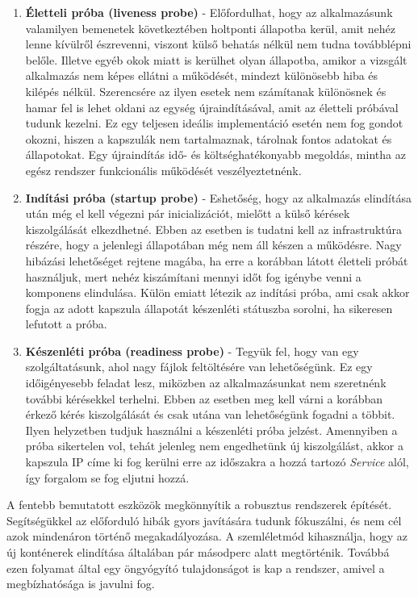 \begin{enumerate}
    \item \textbf{Életteli próba (liveness probe)} - Előfordulhat, hogy az alkalmazásunk valamilyen bemenetek következtében holtponti állapotba kerül, amit nehéz lenne kívülről észrevenni, viszont külső behatás nélkül nem tudna továbblépni belőle. 
    Illetve egyéb okok miatt is kerülhet olyan állapotba, amikor a vizsgált alkalmazás nem képes ellátni a működését, mindezt különösebb hiba és kilépés nélkül.
    Szerencsére az ilyen esetek nem számítanak különösnek és hamar fel is lehet oldani az egység újraindításával, amit az életteli próbával tudunk kezelni.
    Ez egy teljesen ideális implementáció esetén nem fog gondot okozni, hiszen a kapszulák nem tartalmaznak, tárolnak fontos adatokat és állapotokat.
    Egy újraindítás idő- és költséghatékonyabb megoldás, mintha az egész rendszer funkcionális működését veszélyeztetnénk.

    \item \textbf{Indítási próba (startup probe)} - Eshetőség, hogy az alkalmazás elindítása után még el kell végezni pár inicializációt, mielőtt a külső kérések kiszolgálását elkezdhetné.
    Ebben az esetben is tudatni kell az infrastruktúra részére, hogy a jelenlegi állapotában még nem áll készen a működésre.
    Nagy hibázási lehetőséget rejtene magába, ha erre a korábban látott  életteli próbát használjuk, mert nehéz kiszámítani mennyi időt fog igénybe venni a komponens elindulása.
    Külön emiatt létezik az indítási próba, ami csak akkor fogja az adott kapszula állapotát készenléti státuszba sorolni, ha sikeresen lefutott a próba.

    \item \textbf{Készenléti próba (readiness probe)} - Tegyük fel, hogy van egy szolgáltatásunk, ahol nagy fájlok feltöltésére van lehetőségünk.
    Ez egy időigényesebb feladat lesz, miközben az alkalmazásunkat nem szeretnénk további kérésekkel terhelni.
    Ebben az esetben meg kell várni a korábban érkező kérés kiszolgálását és csak utána van lehetőségünk fogadni a többit.
    Ilyen helyzetben tudjuk használni a készenléti próba jelzést. 
    Amennyiben a próba sikertelen vol, tehát jelenleg nem engedhetünk új kiszolgálást, akkor a kapszula IP címe ki fog kerülni erre az időszakra a hozzá tartozó \textit{Service} alól, így forgalom se fog eljutni hozzá. 
    
\end{enumerate}

A fentebb bemutatott eszközök megkönnyítik a robusztus rendszerek építését.
Segítségükkel az előforduló hibák gyors javítására tudunk fókuszálni, és nem cél azok mindenáron történő megakadályozása.
A szemléletmód kihasználja, hogy az új konténerek elindítása általában pár másodperc alatt megtörténik.
Továbbá ezen folyamat által egy öngyógyító tulajdonságot is kap a rendszer, amivel a megbízhatósága is javulni fog. 

